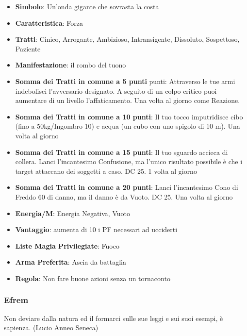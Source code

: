 \begin{multicols}{2}
\begin{itemize}[leftmargin=*] \setlength{\itemsep}{0pt}
\item \textbf{Simbolo}: Un'onda gigante che sovrasta la costa
\item \textbf{Caratteristica}: Forza
\item \textbf{Tratti}: Cinico, Arrogante, Ambizioso, Intransigente, Dissoluto, Sospettoso, Paziente
\item \textbf{Manifestazione}: il rombo del tuono
\item \textbf{Somma dei Tratti in comune a 5 punti} punti: Attraverso le tue armi indebolisci l'avversario designato. A seguito di un colpo critico puoi aumentare di un livello l'affaticamento. Una volta al giorno come Reazione.
\item \textbf{Somma dei Tratti in comune a 10 punti}: Il tuo tocco imputridisce cibo (fino a 50kg/Ingombro 10) e acqua (un cubo con uno spigolo di 10 m). Una volta al giorno
\item \textbf{Somma dei Tratti in comune a 15 punti}: Il tuo sguardo accieca di collera. Lanci l'incantesimo Confusione, ma l'unico risultato possibile è che i target attaccano dei soggetti a caso. DC 25. 1 volta al giorno
\item \textbf{Somma dei Tratti in comune a 20 punti}: Lanci l'incantesimo Cono di Freddo 60 di danno, ma il danno è da Vuoto. DC 25. Una volta al giorno
\item \textbf{Energia/M}: Energia Negativa, Vuoto
\item \textbf{Vantaggio}: aumenta di 10 i PF necessari ad ucciderti
\item \textbf{Liste Magia Privilegiate}: Fuoco
\item \textbf{Arma Preferita}: Ascia da battaglia 
\item \textbf{Regola}: Non fare buone azioni senza un tornaconto
\end{itemize}

\subsubsection{Efrem}\label{efrem}\hypertarget{efrem}{}

\begin{changemargin}{0.3cm}{0.3cm}\begin{enfasi}{
Non deviare dalla natura ed il formarci sulle sue leggi e sui suoi esempi, è sapienza. (Lucio Anneo Seneca)
}\end{enfasi}\end{changemargin}\medskip


\end{multicols}
